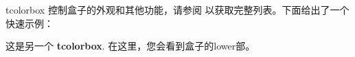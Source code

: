 \begin{docEnvironment}{tcolorbox}{}
{}控制盒子的外观和其他功能，请参阅  以获取完整列表。下面给出了一个快速示例：

\begin{dispExample}
\begin{tcolorbox}[colback=red!5!white,colframe=red!75!black,title=My nice heading]
  这是另一个 \textbf{tcolorbox}.
\tcblower
在这里，您会看到盒子的lower部。
\end{tcolorbox}
\end{dispExample}
\end{docEnvironment}